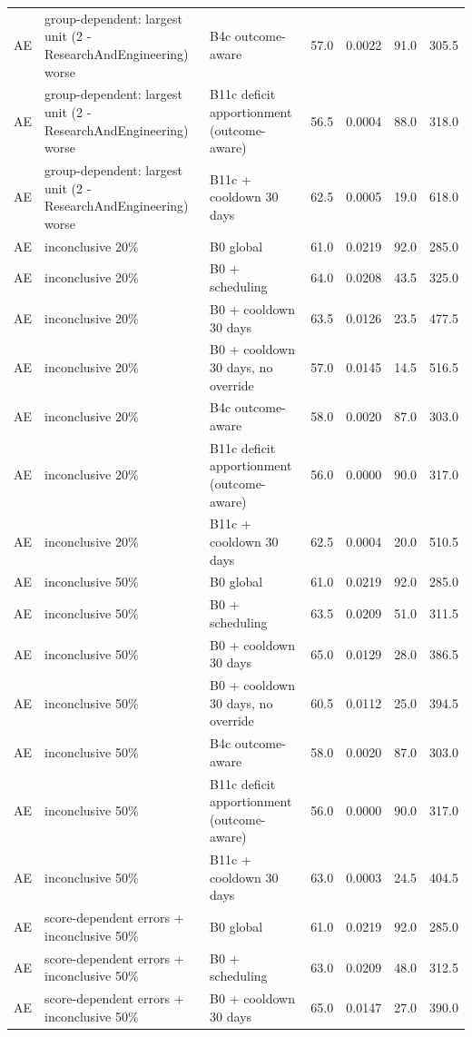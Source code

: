 \begin{longtable}{lp{5.2cm}p{4.4cm}cccc}
AE & group-dependent: largest unit (2 - ResearchAndEngineering) worse & B4c outcome-aware & 57.0 & 0.0022 & 91.0 & 305.5 \\
AE & group-dependent: largest unit (2 - ResearchAndEngineering) worse & B11c deficit apportionment (outcome-aware) & 56.5 & 0.0004 & 88.0 & 318.0 \\
AE & group-dependent: largest unit (2 - ResearchAndEngineering) worse & B11c + cooldown 30 days & 62.5 & 0.0005 & 19.0 & 618.0 \\
AE & inconclusive 20\% & B0 global & 61.0 & 0.0219 & 92.0 & 285.0 \\
AE & inconclusive 20\% & B0 + scheduling & 64.0 & 0.0208 & 43.5 & 325.0 \\
AE & inconclusive 20\% & B0 + cooldown 30 days & 63.5 & 0.0126 & 23.5 & 477.5 \\
AE & inconclusive 20\% & B0 + cooldown 30 days, no override & 57.0 & 0.0145 & 14.5 & 516.5 \\
AE & inconclusive 20\% & B4c outcome-aware & 58.0 & 0.0020 & 87.0 & 303.0 \\
AE & inconclusive 20\% & B11c deficit apportionment (outcome-aware) & 56.0 & 0.0000 & 90.0 & 317.0 \\
AE & inconclusive 20\% & B11c + cooldown 30 days & 62.5 & 0.0004 & 20.0 & 510.5 \\
AE & inconclusive 50\% & B0 global & 61.0 & 0.0219 & 92.0 & 285.0 \\
AE & inconclusive 50\% & B0 + scheduling & 63.5 & 0.0209 & 51.0 & 311.5 \\
AE & inconclusive 50\% & B0 + cooldown 30 days & 65.0 & 0.0129 & 28.0 & 386.5 \\
AE & inconclusive 50\% & B0 + cooldown 30 days, no override & 60.5 & 0.0112 & 25.0 & 394.5 \\
AE & inconclusive 50\% & B4c outcome-aware & 58.0 & 0.0020 & 87.0 & 303.0 \\
AE & inconclusive 50\% & B11c deficit apportionment (outcome-aware) & 56.0 & 0.0000 & 90.0 & 317.0 \\
AE & inconclusive 50\% & B11c + cooldown 30 days & 63.0 & 0.0003 & 24.5 & 404.5 \\
AE & score-dependent errors + inconclusive 50\% & B0 global & 61.0 & 0.0219 & 92.0 & 285.0 \\
AE & score-dependent errors + inconclusive 50\% & B0 + scheduling & 63.0 & 0.0209 & 48.0 & 312.5 \\
AE & score-dependent errors + inconclusive 50\% & B0 + cooldown 30 days & 65.0 & 0.0147 & 27.0 & 390.0 \\

\end{longtable}
